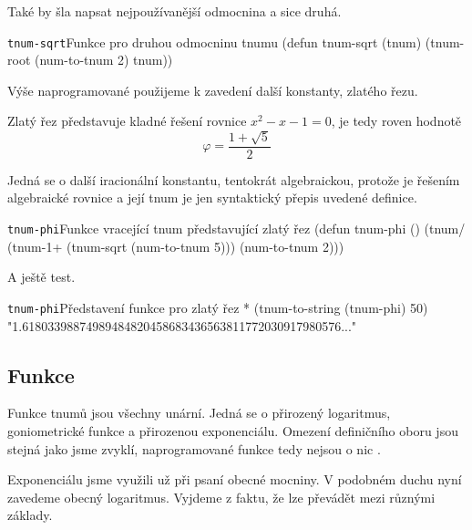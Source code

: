 Také by šla napsat nejpoužívanější odmocnina a sice druhá.

\begin{lispcode}{\texttt{tnum-sqrt}}{Funkce pro druhou odmocninu tnumu}
(\textcolor{funkcionalni}{defun} \textcolor{pojmenovan}{tnum-sqrt} (tnum)
  (\textcolor{moje}{tnum-root} (\textcolor{moje}{num-to-tnum} 2) tnum))
\end{lispcode}

Výše naprogramované použijeme k zavedení další konstanty, zlatého řezu.

\begin{definition}
Zlatý řez představuje kladné řešení rovnice $x^2-x-1=0$, je tedy roven hodnotě
\begin{equation}
\varphi=\frac{1+\sqrt{5}}{2}
\end{equation}
\end{definition}

Jedná se o další iracionální konstantu, tentokrát algebraickou, protože je řešením algebraické rovnice a její tnum je jen syntaktický přepis uvedené definice.

\begin{lispcode}{\texttt{tnum-phi}}{Funkce vracející tnum představující zlatý řez}
(\textcolor{funkcionalni}{defun} \textcolor{pojmenovan}{tnum-phi} ()
  (\textcolor{moje}{tnum/} (\textcolor{moje}{tnum-1+} (\textcolor{moje}{tnum-sqrt} (\textcolor{moje}{num-to-tnum} 5))) (\textcolor{moje}{num-to-tnum} 2)))
\end{lispcode}

A ještě test.

\begin{lisptest}{\texttt{tnum-phi}}{Představení funkce pro zlatý řez}
* (tnum-to-string (tnum-phi) 50)
"1.61803398874989484820458683436563811772030917980576..."
\end{lisptest}

\subsection{Funkce}
Funkce tnumů jsou všechny unární. Jedná se o přirozený logaritmus, goniometrické funkce a přirozenou exponenciálu. Omezení definičního oboru jsou stejná jako jsme zvyklí, naprogramované funkce tedy nejsou o nic .

Exponenciálu jsme využili už při psaní obecné mocniny. V podobném duchu nyní zavedeme obecný logaritmus. Vyjdeme z faktu, že lze převádět mezi různými základy.

